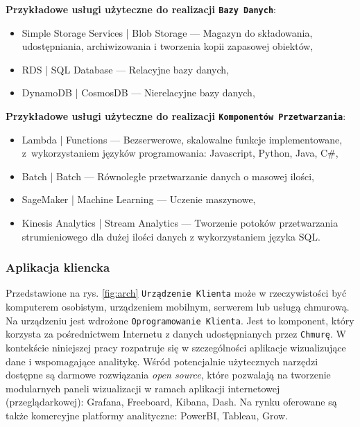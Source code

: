 \documentclass[a4paper, 12pt, twoside]{article}
\begin{document}
\noindent\textbf{Przykładowe usługi użyteczne do realizacji \texttt{Bazy Danych}}:
\begin{itemize}
      \itemsep0em
      \item Simple Storage Services | Blob Storage --- Magazyn do składowania,
            udostępniania, archiwizowania i tworzenia kopii zapasowej obiektów,
      \item RDS | SQL Database --- Relacyjne bazy danych,
      \item DynamoDB | CosmosDB --- Nierelacyjne bazy danych,
\end{itemize}

\noindent\textbf{Przykładowe usługi użyteczne do realizacji \texttt{Komponentów Przetwarzania}}:
\begin{itemize}
      \itemsep0em
      \item Lambda | Functions --- Bezserwerowe, skalowalne funkcje implementowane,
            z~wykorzystaniem języków programowania: Javascript, Python, Java, C\#,
      \item Batch | Batch --- Równoległe przetwarzanie danych o masowej ilości,
      \item SageMaker | Machine Learning --- Uczenie maszynowe,
      \item Kinesis Analytics | Stream Analytics --- Tworzenie potoków przetwarzania
            strumieniowego dla dużej ilości danych z wykorzystaniem języka SQL.
\end{itemize}

\subsubsection{Aplikacja kliencka}

Przedstawione na rys. \ref{fig:arch} \texttt{Urządzenie Klienta} może w rzeczywistości
być komputerem osobistym, urządzeniem mobilnym, serwerem lub usługą chmurową.
Na urządzeniu jest wdrożone \texttt{Oprogramowanie Klienta}. Jest to komponent, który
korzysta za pośrednictwem Internetu z danych udostępnianych przez \texttt{Chmurę}.
W kontekście niniejszej pracy rozpatruje się w szczególności
aplikacje wizualizujące dane i wspomagające analitykę. Wśród potencjalnie
użytecznych narzędzi dostępne są darmowe rozwiązania \emph{open source}, które
pozwalają na tworzenie modularnych paneli wizualizacji w ramach
aplikacji internetowej (przeglądarkowej): Grafana,
Freeboard, Kibana, Dash. Na rynku oferowane są także komercyjne platformy analityczne:
PowerBI, Tableau, Grow.
\end{document}
